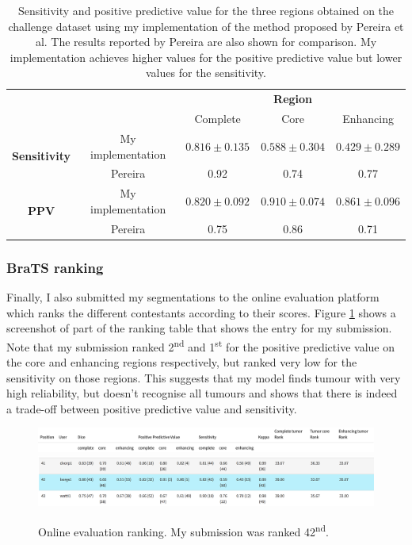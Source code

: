 \documentclass[12pt,a4paper,twoside,openright]{report}
\begin{document}
\begin{table}
\centering	
{\def\arraystretch{1.3}\tabcolsep=5pt
\begin{tabular}{ c  c | c | c | c} 
& \multicolumn{1}{c}{} & \multicolumn{3}{c}{\textbf{Region}} \\
& & Complete & Core & Enhancing \\
\cline{2-5}
\multirow{2}{*}{\textbf{Sensitivity}} & My implementation &	 $0.816 \pm 0.135$ & $0.588 \pm 0.304$  & $0.429 \pm 0.289$ \\
& Pereira  & 0.92 & 0.74 & 0.77 \\
\cline{2-5}
\multirow{2}{*}{\textbf{PPV}} & My implementation & $0.820 \pm 0.092$ & $0.910 \pm 0.074$ & $0.861 \pm 0.096$ \\
& Pereira & 0.75 & 0.86 & 0.71 \\
\end{tabular}
}
\caption{Sensitivity and positive predictive value for the three regions obtained on the challenge dataset using my implementation of the method proposed by Pereira et al. The results reported by Pereira are also shown for comparison. My implementation achieves higher values for the positive predictive value but lower values for the sensitivity.}
\label{table:pereira_sensitivity_average}
\end{table}

\subsubsection{BraTS ranking}
Finally, I also submitted my segmentations to the online evaluation platform which ranks the different contestants according to their scores. Figure \ref{fig:online_eval_rank} shows a screenshot of part of the ranking table that shows the entry for my submission. Note that my submission ranked 2\textsuperscript{nd} and 1\textsuperscript{st} for the positive predictive value on the core and enhancing regions respectively, but ranked very low for the sensitivity on those regions. This suggests that my model finds tumour with very high reliability, but doesn't recognise all tumours and shows that there is indeed a trade-off between positive predictive value and sensitivity.

\begin{figure}
	\centering
	\label{fig:online_eval_rank}
	\includegraphics[width=\textwidth]{ranking_table_header}
	\includegraphics[width=\textwidth]{pereira_model_ranked_results}
	\caption{Online evaluation ranking. My submission was ranked 42\textsuperscript{nd}.}
\end{figure}
\end{document}
